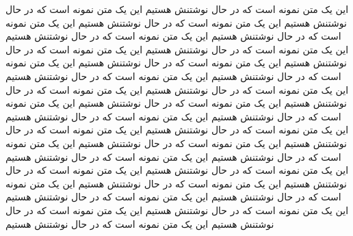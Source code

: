\documentclass[a4paper,12pt,twoside]{book}
\begin{document}
این یک متن نمونه است که در حال نوشتنش هستیم  این یک متن نمونه است که در حال نوشتنش هستیم این یک متن نمونه است که در حال نوشتنش هستیم این یک متن نمونه است که در حال نوشتنش هستیم این یک متن نمونه است که در حال نوشتنش هستیم این یک متن نمونه است که در حال نوشتنش هستیم این یک متن نمونه است که در حال نوشتنش هستیم
این یک متن نمونه است که در حال نوشتنش هستیم  این یک متن نمونه است که در حال نوشتنش هستیم این یک متن نمونه است که در حال نوشتنش هستیم این یک متن نمونه است که در حال نوشتنش هستیم این یک متن نمونه است که در حال نوشتنش هستیم این یک متن نمونه است که در حال نوشتنش هستیم این یک متن نمونه است که در حال نوشتنش هستیم
این یک متن نمونه است که در حال نوشتنش هستیم  این یک متن نمونه است که در حال نوشتنش هستیم این یک متن نمونه است که در حال نوشتنش هستیم این یک متن نمونه است که در حال نوشتنش هستیم این یک متن نمونه است که در حال نوشتنش هستیم این یک متن نمونه است که در حال نوشتنش هستیم این یک متن نمونه است که در حال نوشتنش هستیم
این یک متن نمونه است که در حال نوشتنش هستیم  این یک متن نمونه است که در حال نوشتنش هستیم این یک متن نمونه است که در حال نوشتنش هستیم این یک متن نمونه است که در حال نوشتنش هستیم این یک متن نمونه است که در حال نوشتنش هستیم این یک متن نمونه است که در حال نوشتنش هستیم این یک متن نمونه است که در حال نوشتنش هستیم


\end{document}
